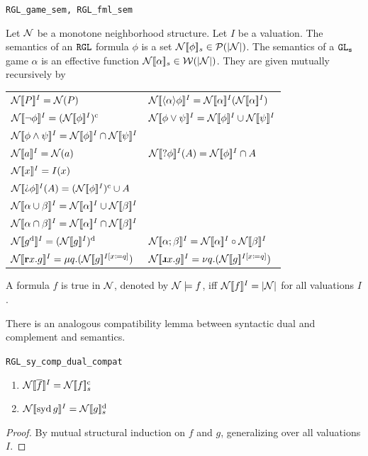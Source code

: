 \begin{bdefinition}
\texttt{RGL\_game\_sem, RGL\_fml\_sem}

    Let $\mathcal N$ be a monotone neighborhood structure. Let $I$ be a valuation. The semantics of an $\texttt{RGL}{}$ formula $\phi$ is a set $\mathcal N[\![ \phi ]\!]_s\in \mathcal P (|\mathcal N|)$. The semantics of a $\texttt{GL\textsubscript{s}}$ game $\alpha$ is an effective function $\mathcal N[\![\alpha]\!]_s\in \mathcal W(|\mathcal N|)$. They are given mutually recursively by
    
    \begin{tabular}{l l}
        $\mathcal N[\![ P]\!]^I = \mathcal N(P)$ 
        & $\mathcal N[\![ \langle\alpha\rangle\phi]\!]^I = \mathcal N[\![\alpha]\!]^I(\mathcal N[\![\alpha]\!]^I)$ \\
        $\mathcal N[\![ \neg\phi]\!]^I = (\mathcal N[\![ \phi]\!]^I)^\text{c}$ 
        & $\mathcal N[\![ \phi\vee\psi]\!]^I=\mathcal N[\![\phi]\!]^I\cup \mathcal N[\![\psi]\!]^I$ \\
        $\mathcal N[\![ \phi\wedge\psi]\!]^I=\mathcal N[\![\phi]\!]^I\cap \mathcal N[\![\psi]\!]^I$ \\
        $\mathcal N[\![ a]\!]^I=\mathcal N(a)$ 
        & $\mathcal N[\![ \text{?}\phi]\!]^I(A)=\mathcal N[\![ \phi]\!]^I\cap A$ \\
        $\mathcal N[\![ x ]\!]^I = I(x)$ \\
        $\N\ddl \DTest\phi\ddr^I(A)=\comp{(\N\ddl \phi\ddr^I)}\cup A$ \\
        $\mathcal N[\![ \alpha\cup\beta]\!]^I=\mathcal N[\![ \alpha]\!]^I \cup \mathcal N[\![ \beta]\!]^I$ \\
        $\mathcal N[\![ \alpha\cap\beta]\!]^I=\mathcal N[\![ \alpha]\!]^I \cap \mathcal N[\![ \beta]\!]^I$ \\
        $\mathcal N[\![g^\text{d}]\!]^I=(\mathcal N[\![ g]\!]^I)^\text{d}$ 
        & $\mathcal N[\![\alpha;\beta]\!]^I=\mathcal N[\![ \alpha]\!]^I\circ \mathcal N[\![\beta]\!]^I$ \\
        $\mathcal N[\![ \textbf{r} x. g]\!]^I=\mu q.(\mathcal N[\![ g]\!]^{I[x\coloneq q]})$ 
        & $\N\ddl \DRec x. g\ddr^I=\nu q.(\N\ddl g\ddr^{I[x\coloneq q]})$  \\
    \end{tabular}

\medskip

A formula $f$ is true in $\mathcal N$, denoted by $\mathcal N \models f$, iff $\mathcal N[\![ f]\!]^I = |\mathcal N|$ for all valuations $I$.

\end{bdefinition}

There is an analogous compatibility lemma between syntactic dual and complement and \RGL{} semantics.

\begin{blemma}
\texttt{RGL\_sy\_comp\_dual\_compat}

\begin{enumerate}
    \item $\mathcal N[\![ \overline f]\!]^I = \mathcal N[\![ f]\!]_s^\text{c} $ \\
    \item $\mathcal N[\![ \operatorname{syd} g]\!]^I = \mathcal N[\![ g]\!]_s^\text{d} $
\end{enumerate}
\end{blemma}
\begin{proof}
    By mutual structural induction on $f$ and $g$, generalizing over all valuations $I$.
\end{proof}

